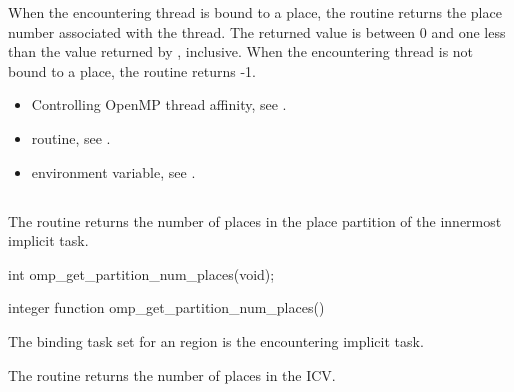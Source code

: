 \effect
When the encountering thread is bound to a place, the
 routine returns the place number associated
with the thread. The returned value is between 0 and one less than the
value returned by , inclusive. When the
encountering thread is not bound to a place, the routine returns -1.

\crossreferences
\begin{itemize}
\item Controlling OpenMP thread affinity, see
.

\item {} routine, see
.

\item {} environment variable, see
.
\end{itemize}





\subsection{}
\label{subsec:omp_get_partition_num_places}

\summary
The  routine returns the number of places in the place partition
of the innermost implicit task.

\format
\begin{ccppspecific}
\begin{ompcFunction}
int omp_get_partition_num_places(void);
\end{ompcFunction}
\end{ccppspecific}

\begin{fortranspecific}
\begin{ompfFunction}
integer function omp_get_partition_num_places()
\end{ompfFunction}
\end{fortranspecific}

\binding
The binding task set for an   region is the encountering implicit task.

\effect
The  routine returns the number of places in the  ICV.

